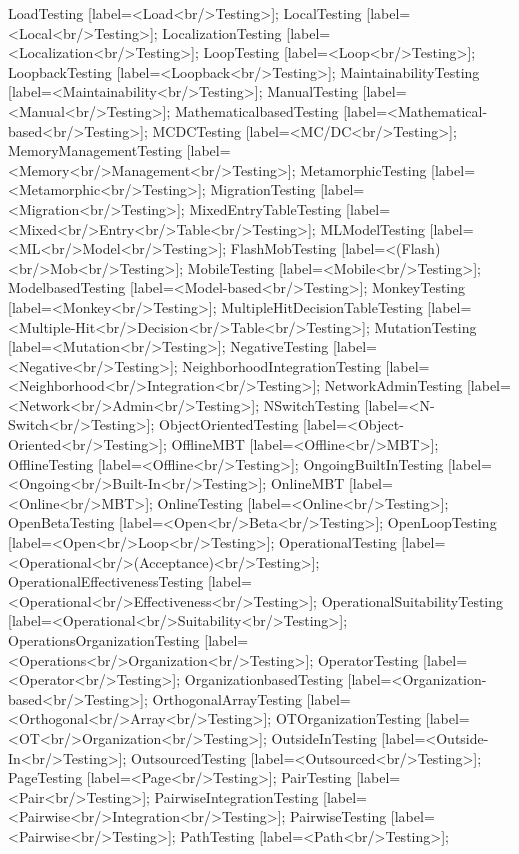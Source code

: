 \documentclass{article}
\begin{document}
{LoadTesting [label=<Load<br/>Testing>];
LocalTesting [label=<Local<br/>Testing>];
LocalizationTesting [label=<Localization<br/>Testing>];
LoopTesting [label=<Loop<br/>Testing>];
LoopbackTesting [label=<Loopback<br/>Testing>];
MaintainabilityTesting [label=<Maintainability<br/>Testing>];
ManualTesting [label=<Manual<br/>Testing>];
MathematicalbasedTesting [label=<Mathematical-based<br/>Testing>];
MCDCTesting [label=<MC/DC<br/>Testing>];
MemoryManagementTesting [label=<Memory<br/>Management<br/>Testing>];
MetamorphicTesting [label=<Metamorphic<br/>Testing>];
MigrationTesting [label=<Migration<br/>Testing>];
MixedEntryTableTesting [label=<Mixed<br/>Entry<br/>Table<br/>Testing>];
MLModelTesting [label=<ML<br/>Model<br/>Testing>];
FlashMobTesting [label=<(Flash)<br/>Mob<br/>Testing>];
MobileTesting [label=<Mobile<br/>Testing>];
ModelbasedTesting [label=<Model-based<br/>Testing>];
MonkeyTesting [label=<Monkey<br/>Testing>];
MultipleHitDecisionTableTesting [label=<Multiple-Hit<br/>Decision<br/>Table<br/>Testing>];
MutationTesting [label=<Mutation<br/>Testing>];
NegativeTesting [label=<Negative<br/>Testing>];
NeighborhoodIntegrationTesting [label=<Neighborhood<br/>Integration<br/>Testing>];
NetworkAdminTesting [label=<Network<br/>Admin<br/>Testing>];
NSwitchTesting [label=<N-Switch<br/>Testing>];
ObjectOrientedTesting [label=<Object-Oriented<br/>Testing>];
OfflineMBT [label=<Offline<br/>MBT>];
OfflineTesting [label=<Offline<br/>Testing>];
OngoingBuiltInTesting [label=<Ongoing<br/>Built-In<br/>Testing>];
OnlineMBT [label=<Online<br/>MBT>];
OnlineTesting [label=<Online<br/>Testing>];
OpenBetaTesting [label=<Open<br/>Beta<br/>Testing>];
OpenLoopTesting [label=<Open<br/>Loop<br/>Testing>];
OperationalTesting [label=<Operational<br/>(Acceptance)<br/>Testing>];
OperationalEffectivenessTesting [label=<Operational<br/>Effectiveness<br/>Testing>];
OperationalSuitabilityTesting [label=<Operational<br/>Suitability<br/>Testing>];
OperationsOrganizationTesting [label=<Operations<br/>Organization<br/>Testing>];
OperatorTesting [label=<Operator<br/>Testing>];
OrganizationbasedTesting [label=<Organization-based<br/>Testing>];
OrthogonalArrayTesting [label=<Orthogonal<br/>Array<br/>Testing>];
OTOrganizationTesting [label=<OT<br/>Organization<br/>Testing>];
OutsideInTesting [label=<Outside-In<br/>Testing>];
OutsourcedTesting [label=<Outsourced<br/>Testing>];
PageTesting [label=<Page<br/>Testing>];
PairTesting [label=<Pair<br/>Testing>];
PairwiseIntegrationTesting [label=<Pairwise<br/>Integration<br/>Testing>];
PairwiseTesting [label=<Pairwise<br/>Testing>];
PathTesting [label=<Path<br/>Testing>];
}
\end{document}
